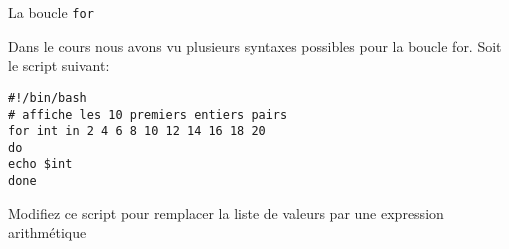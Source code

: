 \begin{exercice}
  \begin{exercicelet}{La boucle \texttt{for}}
    \begin{questions}
    \item Dans le cours nous avons vu plusieurs syntaxes possibles pour la boucle for. Soit le script suivant:
    \begin{minipage}[c]{5cm}
    \begin{verbatim}
#!/bin/bash
# affiche les 10 premiers entiers pairs
for int in 2 4 6 8 10 12 14 16 18 20
do
echo $int
done   
	\end{verbatim}
	\end{minipage}

	\item Modifiez ce script pour remplacer la liste de valeurs par une expression arithmétique

    \end{questions}
  \end{exercicelet}
\end{exercice}

